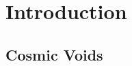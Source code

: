 \chapter{\label{intro}Introduction}
\section{Cosmic Voids}
\setcounter{equation}{0}
\setcounter{table}{0}
\setcounter{figure}{0}


    



